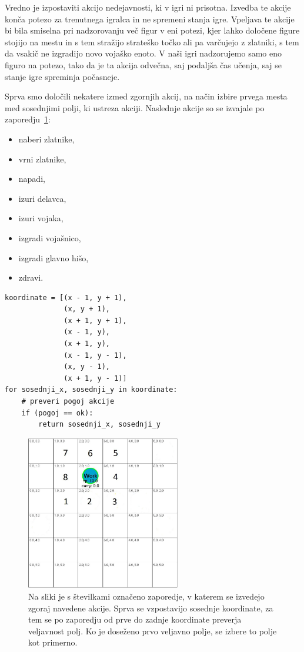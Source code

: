\documentclass[a4paper, 12pt]{book}
\begin{document}
Vredno je izpostaviti akcijo nedejavnosti, ki v igri ni prisotna.
Izvedba te akcije konča potezo za trenutnega igralca in ne spremeni stanja igre.
Vpeljava te akcije bi bila smiselna pri nadzorovanju več figur v eni potezi, kjer lahko določene figure stojijo na mestu in s tem stražijo strateško točko ali pa varčujejo z zlatniki, s tem da vsakič ne izgradijo novo vojaško enoto.
V naši igri nadzorujemo samo eno figuro na potezo, tako da je ta akcija odvečna, saj podaljša čas učenja, saj se stanje igre spreminja počasneje.



Sprva smo določili nekatere izmed zgornjih akcij, na način izbire prvega mesta med sosednjimi polji, ki ustreza akciji. 
Naslednje akcije so se izvajale po zaporedju~\ref{pickorakiPreverjanja}:
\begin{itemize}
	\item naberi zlatnike,
	\item vrni zlatnike,
	\item napadi,
	\item izuri delavca,
	\item izuri vojaka, 
	\item izgradi vojašnico,
	\item izgradi glavno hišo,
	\item zdravi.
\end{itemize}
\begin{verbatim}
koordinate = [(x - 1, y + 1),
              (x, y + 1),
              (x + 1, y + 1),
              (x - 1, y),
              (x + 1, y),
              (x - 1, y - 1),
              (x, y - 1),
              (x + 1, y - 1)]
for sosednji_x, sosednji_y in koordinate:
    # preveri pogoj akcije
    if (pogoj == ok):
        return sosednji_x, sosednji_y
\end{verbatim}

\begin{figure}[h!]
	\begin{center}
		\includegraphics[width=0.6\textwidth]{photos/korakiPreverjanja.pdf}
	\end{center}
	\caption{Na sliki je s številkami označeno zaporedje, v katerem se izvedejo zgoraj navedene akcije. 
		Sprva se vzpostavijo sosednje koordinate, za tem se po zaporedju od prve do zadnje koordinate preverja veljavnost polj. 
		Ko je doseženo prvo veljavno polje, se izbere to polje kot primerno. }
	\label{pickorakiPreverjanja}
\end{figure}
\end{document}
